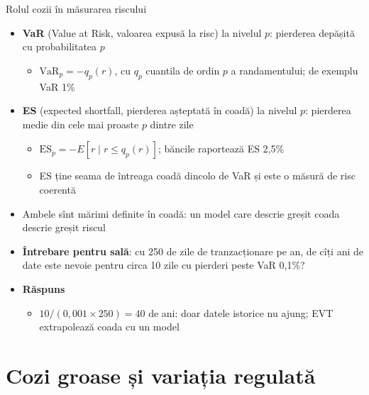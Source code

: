 \begin{frame}{Rolul cozii în măsurarea riscului}
\itemsize{\small}
\begin{itemize}
    \item \textbf{VaR} (Value at Risk, valoarea expusă la risc) la nivelul $p$: pierderea depășită cu probabilitatea $p$
    \begin{itemize}
        \item $\mathrm{VaR}_p = -q_p(r)$, cu $q_p$ cuantila de ordin $p$ a randamentului; de exemplu VaR 1\%
    \end{itemize}
    \item \textbf{ES} (expected shortfall, pierderea așteptată în coadă) la nivelul $p$: pierderea medie din cele mai proaste $p$ dintre zile
    \begin{itemize}
        \item $\mathrm{ES}_p = -E[r \mid r \le q_p(r)]$; băncile raportează ES 2,5\% 
        \item ES ține seama de întreaga coadă dincolo de VaR și este o măsură de risc coerentă 
    \end{itemize}
    \item Ambele sînt mărimi definite în coadă: un model care descrie greșit coada descrie greșit riscul
    \item \textbf{Întrebare pentru sală}: cu 250 de zile de tranzacționare pe an, de cîți ani de date este nevoie pentru circa 10 zile cu pierderi peste VaR 0,1\%?
    \item \textbf{Răspuns}
    \begin{itemize}
        \item $10 / (0{,}001 \times 250) = 40$ de ani: doar datele istorice nu ajung; EVT extrapolează coada cu un model
    \end{itemize}
\end{itemize}
\end{frame}


\section{Cozi groase și variația regulată}

